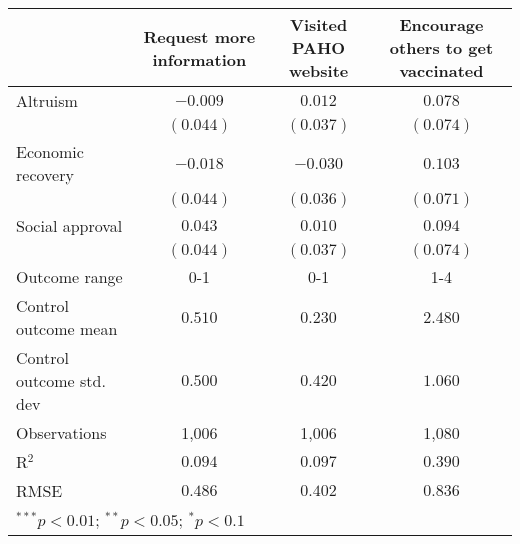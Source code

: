 \begin{table}
\begin{center}
\begin{tabular}{l c c c}
\hline
 & Request more information & Visited PAHO website & Encourage others to get vaccinated \\
\hline
Altruism                 & $-0.009$  & $0.012$   & $0.078$   \\
                         & $(0.044)$ & $(0.037)$ & $(0.074)$ \\
Economic recovery        & $-0.018$  & $-0.030$  & $0.103$   \\
                         & $(0.044)$ & $(0.036)$ & $(0.071)$ \\
Social approval          & $0.043$   & $0.010$   & $0.094$   \\
                         & $(0.044)$ & $(0.037)$ & $(0.074)$ \\
\hline
Outcome range            & 0-1       & 0-1       & 1-4       \\
Control outcome mean     & $0.510$   & $0.230$   & $2.480$   \\
Control outcome std. dev & $0.500$   & $0.420$   & $1.060$   \\
Observations             & 1,006     & 1,006     & 1,080     \\
R$^{2}$                  & $0.094$   & $0.097$   & $0.390$   \\
RMSE                     & $0.486$   & $0.402$   & $0.836$   \\
\hline
\multicolumn{4}{l}{\scriptsize{$^{***}p<0.01$; $^{**}p<0.05$; $^{*}p<0.1$}}
\end{tabular}
\caption{}
\label{table:Tables and Figures/SI_table23_motiv_Chile_behav}
\end{center}
\end{table}
